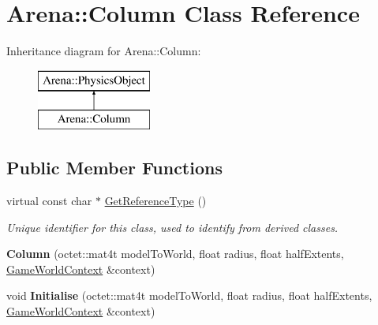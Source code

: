\hypertarget{class_arena_1_1_column}{\section{Arena\+:\+:Column Class Reference}
\label{class_arena_1_1_column}
}
Inheritance diagram for Arena\+:\+:Column\+:\begin{figure}[H]
\begin{center}
\leavevmode
\includegraphics[height=2.000000cm]{class_arena_1_1_column}
\end{center}
\end{figure}
\subsection*{Public Member Functions}
\begin{DoxyCompactItemize}
\item 
\hypertarget{class_arena_1_1_column_ada6c6ae37547b47f677a1c452ad60acc}{virtual const char $\ast$ \hyperlink{class_arena_1_1_column_ada6c6ae37547b47f677a1c452ad60acc}{Get\+Reference\+Type} ()}\label{class_arena_1_1_column_ada6c6ae37547b47f677a1c452ad60acc}

\begin{DoxyCompactList}\small\item\em Unique identifier for this class, used to identify from derived classes. \end{DoxyCompactList}\item 
\hypertarget{class_arena_1_1_column_a11f7d8799a1daff34f7d4080bbcbddd2}{{\bfseries Column} (octet\+::mat4t model\+To\+World, float radius, float half\+Extents, \hyperlink{struct_arena_1_1_game_world_context}{Game\+World\+Context} \&context)}\label{class_arena_1_1_column_a11f7d8799a1daff34f7d4080bbcbddd2}

\item 
\hypertarget{class_arena_1_1_column_ac0dd8da5448c465e2e1b8ab1d0d21cde}{void {\bfseries Initialise} (octet\+::mat4t model\+To\+World, float radius, float half\+Extents, \hyperlink{struct_arena_1_1_game_world_context}{Game\+World\+Context} \&context)}\label{class_arena_1_1_column_ac0dd8da5448c465e2e1b8ab1d0d21cde}

\end{DoxyCompactItemize}
